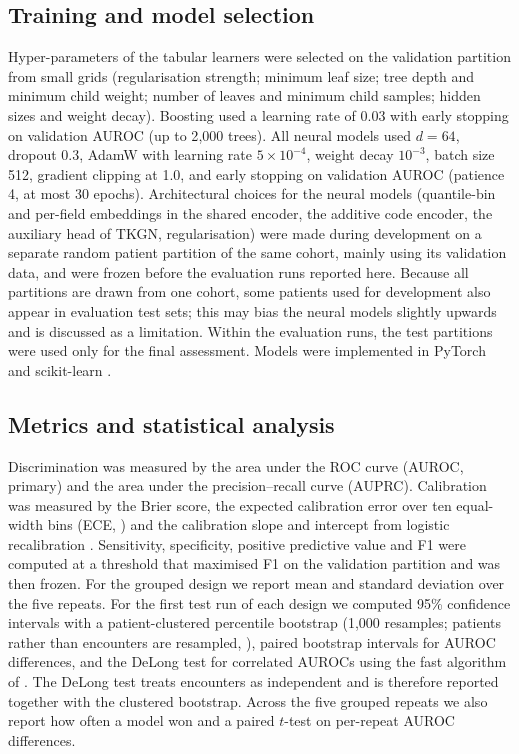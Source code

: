 \documentclass[preprint,12pt,authoryear]{elsarticle}
\begin{document}
\subsection{Training and model selection}
Hyper-parameters of the tabular learners were selected on the validation
partition from small grids (regularisation strength; minimum leaf size;
tree depth and minimum child weight; number of leaves and minimum child
samples; hidden sizes and weight decay). Boosting used a learning rate of
0.03 with early stopping on validation AUROC (up to 2{,}000 trees). All
neural models used $d=64$, dropout 0.3, AdamW \citep{loshchilov2019} with
learning rate $5\times10^{-4}$, weight decay $10^{-3}$, batch size 512,
gradient clipping at 1.0, and early stopping on validation AUROC (patience
4, at most 30 epochs). Architectural choices for the neural models
(quantile-bin and per-field embeddings in the shared encoder, the additive
code encoder, the auxiliary head of TKGN, regularisation) were made during
development on a separate random patient partition of the same cohort,
mainly using its validation data, and were frozen before the evaluation
runs reported here. Because all partitions are drawn from one cohort, some
patients used for development also appear in evaluation test sets; this may
bias the neural models slightly upwards and is discussed as a limitation.
Within the evaluation runs, the test partitions were used only for the
final assessment. Models were implemented in PyTorch
\citep{paszke2019} and scikit-learn \citep{pedregosa2011}.

\subsection{Metrics and statistical analysis}
Discrimination was measured by the area under the ROC curve (AUROC,
primary) and the area under the precision--recall curve (AUPRC).
Calibration was measured by the Brier score, the expected calibration
error over ten equal-width bins (ECE, \citealp{naeini2015}) and the
calibration slope and intercept from logistic recalibration
\citep{vancalster2019}. Sensitivity, specificity, positive predictive
value and F1 were computed at a threshold that maximised F1 on the
validation partition and was then frozen. For the grouped design we
report mean and standard deviation over the five repeats. For the first
test run of each design we computed 95\% confidence intervals with a
patient-clustered percentile bootstrap (1{,}000 resamples; patients
rather than encounters are resampled, \citealp{efron1993}), paired
bootstrap intervals for AUROC differences, and the DeLong test for
correlated AUROCs \citep{delong1988} using the fast algorithm of
\citet{sun2014}. The DeLong test treats encounters as independent and is
therefore reported together with the clustered bootstrap. Across the five
grouped repeats we also report how often a model won and a paired
$t$-test on per-repeat AUROC differences.
\end{document}
